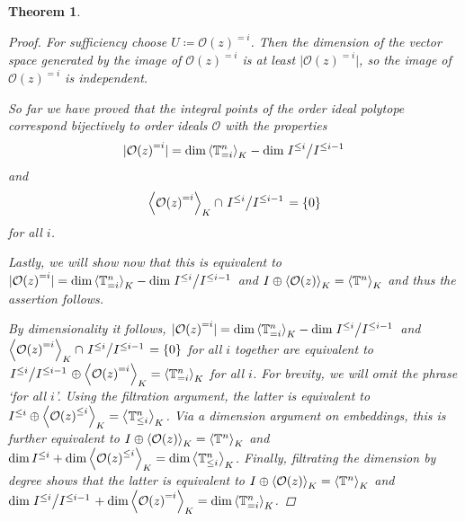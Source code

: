 \documentclass[11pt,oneside,english]{amsart}
\makeatletter
\numberwithin{equation}{section}
\numberwithin{figure}{section}
\theoremstyle{plain}
\newtheorem{thm}{Theorem}[section]
\theoremstyle{definition}
\theoremstyle{definition}
\theoremstyle{remark}
\theoremstyle{plain}
\theoremstyle{plain}
\theoremstyle{plain}
\theoremstyle{problem@}
\makeatother
\begin{document}
\begin{thm}
\begin{proof}
For \emph{sufficiency}
choose $U\coloneqq {{\mathcal{O}}(z)}^{=i}$. Then
the dimension of the vector space generated by the image of \({{\mathcal{O}}(z)}^{=i}\)
is at least
\(\lvert{{\mathcal{O}}(z)}^{=i}\rvert\),
so the image of \({{\mathcal{O}}(z)}^{=i}\)  is independent. 

So far we have proved that the integral points of the order ideal polytope
correspond bijectively to order ideals \({\mathcal{O}}\) with the properties
\[
\lvert {{\mathcal{O}}(z)}^{=i} \rvert = \dim {{\left\langle {{\mathbb{T}}^n_{=i}}\right\rangle}\sb{K}} -
\dim \left. I^{\leq i} \middle/ I^{\leq i-1} \right.
\]
and
\[
{{\left\langle {{{\mathcal{O}}(z)}^{=i}}\right\rangle}\sb{K}} \cap \left. I^{\leq i} \middle/ I^{\leq i-1} \right. = \{0\}
\]
for all \(i\).

Lastly, we will show now that this is equivalent to
$\lvert {{\mathcal{O}}(z)}^{=i} \rvert = \dim {{\left\langle {{\mathbb{T}}^n_{=i}}\right\rangle}\sb{K}} -
\dim \left. I^{\leq i} \middle/ I^{\leq i-1} \right.$
and $I \oplus {{\left\langle {{\mathcal{O}}(z)}\right\rangle}\sb{K}} = {{\left\langle {{\mathbb{T}}^n}\right\rangle}\sb{K}}$ and thus the assertion follows.

By dimensionality it follows, 
$\lvert {{\mathcal{O}}(z)}^{=i} \rvert = \dim {{\left\langle {{\mathbb{T}}^n_{=i}}\right\rangle}\sb{K}} -
\dim \left. I^{\leq i} \middle/ I^{\leq i-1} \right.$
and
${{\left\langle {{{\mathcal{O}}(z)}^{=i}}\right\rangle}\sb{K}} \cap \left. I^{\leq i} \middle/ I^{\leq i-1} \right. =
\{0\}$
for all $i$
together are equivalent to
$\left. I^{\leq i} \middle/ I^{\leq i-1} \right.\oplus {{\left\langle {{{\mathcal{O}}(z)}^{=i}}\right\rangle}\sb{K}} =
{{\left\langle {{\mathbb{T}}^n_{=i}}\right\rangle}\sb{K}}$
for all $i$.
For brevity,
we will omit the phrase \lq for all \(i\)\rq.
Using the filtration argument,
the latter is equivalent to
$I^{\leq i} \oplus {{\left\langle {{{\mathcal{O}}(z)}^{\leq i}}\right\rangle}\sb{K}} = {{\left\langle {{\mathbb{T}}^n_{\leq i}}\right\rangle}\sb{K}}$.
Via a dimension argument on embeddings,
this is further equivalent to
$I \oplus {{\left\langle {{\mathcal{O}}(z)}\right\rangle}\sb{K}} = {{\left\langle {{\mathbb{T}}^n}\right\rangle}\sb{K}}$
and
$\dim I^{\leq i} + \dim {{\left\langle {{{\mathcal{O}}(z)}^{\leq i}}\right\rangle}\sb{K}} = \dim{{\left\langle {{\mathbb{T}}^n_{\leq i}}\right\rangle}\sb{K}}$.
Finally, filtrating the dimension by degree shows that the latter
is equivalent to
$I \oplus {{\left\langle {{\mathcal{O}}(z)}\right\rangle}\sb{K}} = {{\left\langle {{\mathbb{T}}^n}\right\rangle}\sb{K}}$
and
$\dim \left. I^{\leq i} \middle/ I^{\leq i-1} \right. +
\dim {{\left\langle {{{\mathcal{O}}(z)}^{=i}}\right\rangle}\sb{K}} = \dim{{\left\langle {{\mathbb{T}}^n_{=i}}\right\rangle}\sb{K}}$.
\end{proof}
\end{thm}
\end{document}
